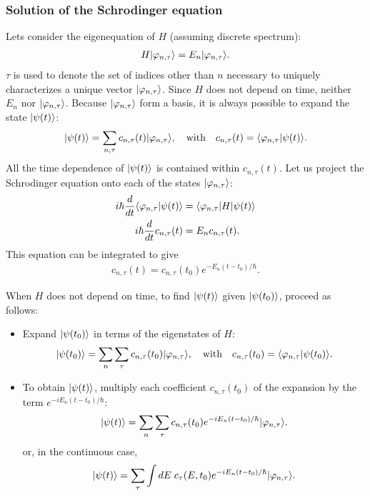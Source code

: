 \subsubsection{Solution of the Schrodinger equation}
Lets consider the eigenequation of $H$ (assuming discrete spectrum):
\begin{align}
    H|\varphi_{n,\tau}\rangle=E_n|\varphi_{n,\tau}\rangle.
\end{align}
$\tau$ is used to denote the set of indices other than $n$ necessary to uniquely characterizes a unique vector $|\varphi_{n,\tau}\rangle$.
Since $H$ does not depend on time, neither $E_n$ nor $|\varphi_{n,\tau}\rangle$. Because $|\varphi_{n,\tau}\rangle$ form a basis,
it is always possible to expand the state $|\psi(t)\rangle$:
\begin{align*}
    |\psi(t)\rangle=\sum_{n,\tau}c_{n,\tau}(t)|\varphi_{n,\tau}\rangle,\quad\text{with}\quad c_{n,\tau}(t)=\langle\varphi_{n,\tau}|\psi(t)\rangle.
\end{align*}
All the time dependence of $|\psi(t)\rangle$ is contained within $c_{n,\tau}(t)$. Let us project the Schrodinger equation onto each 
of the states $|\varphi_{n,\tau}\rangle$:
\begin{align*}
    i\hbar\frac{d}{dt}\langle\varphi_{n,\tau}|\psi(t)\rangle&=\langle\varphi_{n,\tau}|H|\psi(t)\rangle\\
    i\hbar\frac{d}{dt}c_{n,\tau}(t)&=E_nc_{n,\tau}(t).
\end{align*}
This equation can be integrated to give
\begin{align}
    c_{n,\tau}(t)=c_{n,\tau}(t_0)e^{-E_n(t-t_0)/\hbar}.
\end{align}
\begin{emphasizer}[]
    When $H$ does not depend on time, to find $|\psi(t)\rangle$ given $|\psi(t_0)\rangle$, proceed as follows:
    \begin{itemize}[itemsep=0pt,topsep=0pt]
        \item Expand $|\psi(t_0)\rangle$ in terms of the eigenstates of $H$:
            \begin{align*}
                |\psi(t_0)\rangle=\sum_n\sum_\tau c_{n,\tau}(t_0)|\varphi_{n,\tau}\rangle,\quad\text{with}\quad c_{n,\tau}(t_0)=\langle\varphi_{n,\tau}|\psi(t_0)\rangle.
            \end{align*}
        \item To obtain $|\psi(t)\rangle$, multiply each coefficient $c_{n,\tau}(t_0)$ of the expansion by the term $e^{-iE_n(t-t_0)/\hbar}$:
        \begin{align*}
            |\psi(t)\rangle=\sum_n\sum_\tau c_{n,\tau}(t_0)e^{-iE_n(t-t_0)/\hbar}|\varphi_{n,\tau}\rangle.
        \end{align*}
        or, in the continuous case,
        \begin{align*}
            |\psi(t)\rangle=\sum_\tau\int dE\;c_\tau(E,t_0)e^{-iE_n(t-t_0)/\hbar}|\varphi_{n,\tau}\rangle.
        \end{align*}
    \end{itemize}
\end{emphasizer}


